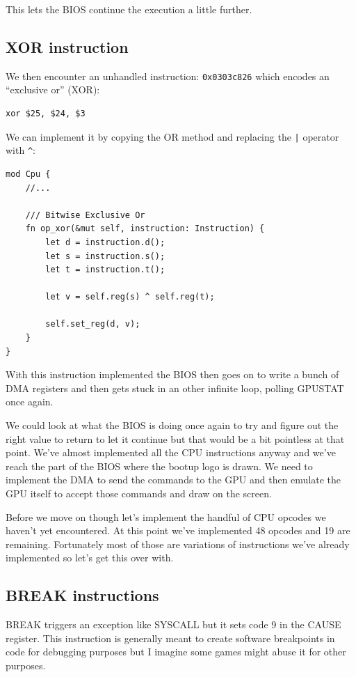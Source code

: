 \documentclass[a4paper]{article}
\newcommand{\code}[1] {\texttt{#1}}
\begin{document}
This lets the BIOS continue the execution a little further.

\subsection{XOR instruction}

We then encounter an unhandled instruction: \code{0x0303c826} which
encodes an ``exclusive or'' (XOR):

\begin{lstlisting}[language=assembly]
xor $25, $24, $3
\end{lstlisting}

We can implement it by copying the OR method and replacing the
\code{|} operator with \code{\^{}}:

\begin{lstlisting}
mod Cpu {
    //...

    /// Bitwise Exclusive Or
    fn op_xor(&mut self, instruction: Instruction) {
        let d = instruction.d();
        let s = instruction.s();
        let t = instruction.t();

        let v = self.reg(s) ^ self.reg(t);

        self.set_reg(d, v);
    }
}
\end{lstlisting}

With this instruction implemented the BIOS then goes on to write a
bunch of DMA registers and then gets stuck in an other infinite loop,
polling GPUSTAT once again.

We could look at what the BIOS is doing once again to try and figure
out the right value to return to let it continue but that would be a
bit pointless at that point. We've almost implemented all the CPU
instructions anyway and we've reach the part of the BIOS where the
bootup logo is drawn. We need to implement the DMA to send the
commands to the GPU and then emulate the GPU itself to accept those
commands and draw on the screen.

Before we move on though let's implement the handful of CPU opcodes we
haven't yet encountered. At this point we've implemented 48 opcodes
and 19 are remaining.  Fortunately most of those are variations of
instructions we've already implemented so let's get this over with.

\subsection{BREAK instructions}

BREAK triggers an exception like SYSCALL but it sets code 9 in the
CAUSE register. This instruction is generally meant to create software
breakpoints in code for debugging purposes but I imagine some games
might abuse it for other purposes.
\end{document}
